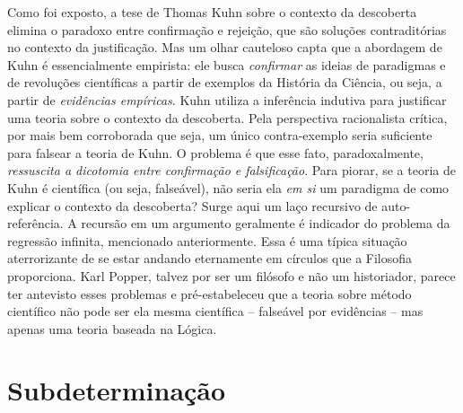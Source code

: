 \documentclass[./main.tex]{subfiles}
\begin{document}
\par Como foi exposto, a tese de Thomas Kuhn sobre o contexto da descoberta elimina o paradoxo entre confirmação e rejeição, que são soluções contraditórias no contexto da justificação. Mas um olhar cauteloso capta que a abordagem de Kuhn é essencialmente empirista: ele busca \textit{confirmar} as ideias de paradigmas e de revoluções científicas a partir de exemplos da História da Ciência, ou seja, a partir de \textit{evidências empíricas}. Kuhn utiliza a inferência indutiva para justificar uma teoria sobre o contexto da descoberta. Pela perspectiva racionalista crítica, por mais bem corroborada que seja, um único contra-exemplo seria suficiente para falsear a teoria de Kuhn. O problema é que esse fato, paradoxalmente, \textit{ressuscita a dicotomia entre confirmação e falsificação}. Para piorar, se a teoria de Kuhn é científica (ou seja, falseável), não seria ela \textit{em si} um \gls{paradigma} de como explicar o contexto da descoberta? Surge aqui um laço recursivo de auto-referência. A recursão em um argumento geralmente é indicador do problema da regressão infinita, mencionado anteriormente. Essa é uma típica situação aterrorizante de se estar andando eternamente em círculos que a Filosofia proporciona. Karl Popper, talvez por ser um filósofo e não um historiador, parece ter antevisto esses problemas e pré-estabeleceu que a teoria sobre método científico não pode ser ela mesma científica -- falseável por evidências -- mas apenas uma teoria baseada na Lógica.

\section{Subdeterminação} \label{sec:epis:under}
\end{document}
